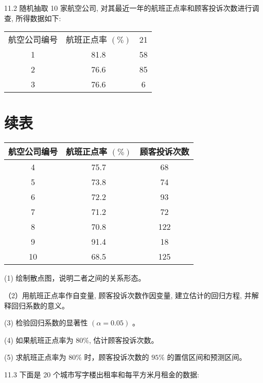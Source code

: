 \documentclass[10pt]{article}
\begin{document}
\begin{CJK*}{UTF8}{bsmi}
11.2 随机抽取 10 家航空公司, 对其最近一年的航班正点率和顾客投诉次数进行调查, 所得数据如下:

\begin{center}
\begin{tabular}{ccc}
\hline
航空公司编号 & 航班正点率 $(\%)$ & 21 \\
1 & 81.8 & 58 \\
2 & 76.6 & 85 \\
3 & 76.6 & 6 \\
\hline
\end{tabular}
\end{center}

\section*{续表}
\begin{center}
\begin{tabular}{ccc}
\hline
航空公司编号 & 航班正点率 $(\%)$ & 顾客投诉次数 \\
\hline
4 & 75.7 & 68 \\
5 & 73.8 & 74 \\
6 & 72.2 & 93 \\
7 & 71.2 & 72 \\
8 & 70.8 & 122 \\
9 & 91.4 & 18 \\
10 & 68.5 & 125 \\
\hline
\end{tabular}
\end{center}

(1) 绘制散点图，说明二者之间的关系形态。

（2）用航班正点率作自变量, 顾客投诉次数作因变量, 建立估计的回归方程, 并解释回归系数的意义。

(3) 检验回归系数的显著性 $(\alpha=0.05)$ 。

(4) 如果航班正点率为 $80 \%$, 估计顾客投诉次数。

(5) 求航班正点率为 $80 \%$ 时，顾客投诉次数的 $95 \%$ 的置信区间和预测区间。

11.3 下面是 20 个城市写字楼出租率和每平方米月租金的数据:


\end{CJK*}
\end{document}

